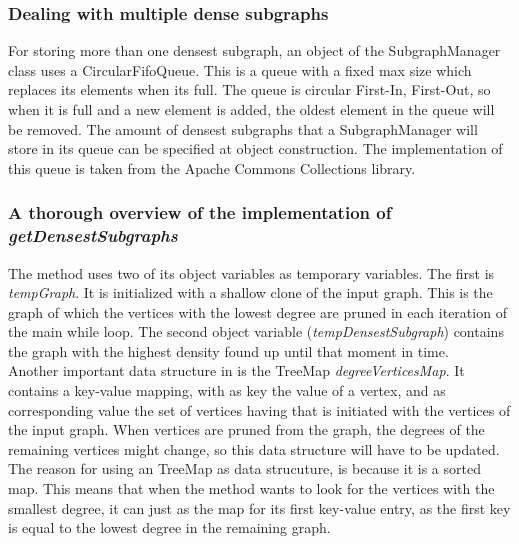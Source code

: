 \documentclass[10pt,a4paper]{article}
\begin{document}
\subsubsection{Dealing with multiple dense subgraphs}
For storing more than one densest subgraph, an object of the SubgraphManager class uses a CircularFifoQueue. This is a queue with a fixed max size which replaces its elements when its full. The queue is circular First-In, First-Out, so when it is full and a new element is added, the oldest element in the queue will be removed. The amount of densest subgraphs that a SubgraphManager will store in its queue can be specified at object construction. The implementation of this queue is taken from the Apache Commons Collections library.
\subsubsection{A thorough overview of the implementation of \emph{getDensestSubgraphs}}
The method uses two of its object variables as temporary variables. The first is \emph{tempGraph}. It is initialized with a shallow clone of the input graph. This is the graph of which the vertices with the lowest degree are pruned in each iteration of the main while loop. The second object variable (\emph{tempDensestSubgraph}) contains the graph with the highest density found up until that moment in time.\\

Another important data structure in is the TreeMap \emph{degreeVerticesMap}. It contains a key-value mapping, with as key the value of a vertex,  and as corresponding value the set of vertices having that is initiated with the vertices of the input graph. When vertices are pruned from the graph, the degrees of the remaining vertices might change, so this data structure will have to be updated. The reason for using an TreeMap as data strucuture, is because it is a sorted map. This means that when the method wants to look for the vertices with the smallest degree, it can just as the map for its first key-value entry, as the first key is equal to the lowest degree in the remaining graph.\\
\end{document}
